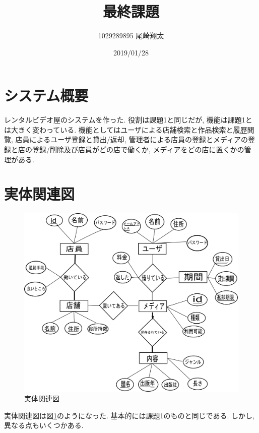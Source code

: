 \documentclass{jarticle}
\begin{document}
\title{最終課題}
\author{1029289895 尾崎翔太}
\date{2019/01/28}

\maketitle
\newpage

\section{システム概要}
レンタルビデオ屋のシステムを作った. 役割は課題1と同じだが, 機能は課題1とは大きく変わっている. 機能としてはユーザによる店舗検索と作品検索と履歴閲覧, 店員によるユーザ登録と貸出/返却, 管理者による店員の登録とメディアの登録と店の登録/削除及び店員がどの店で働くか, メディアをどの店に置くかの管理がある.

\section{実体関連図}
\begin{figure}[tp]
\begin{center}
\includegraphics[scale=0.2]{ER_final.png}
\end{center}
\caption{実体関連図}
\label{fig:er}
\end{figure}
実体関連図は図\ref{fig:er}のようになった. 基本的には課題1のものと同じである. しかし, 異なる点もいくつかある.
\end{document}
